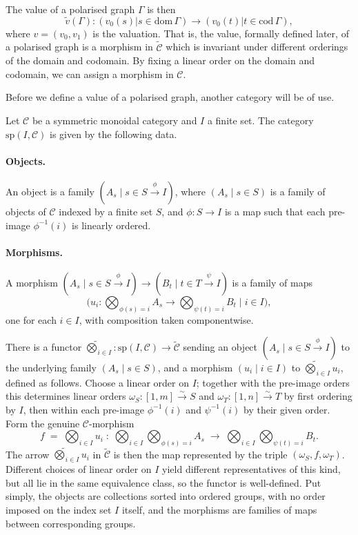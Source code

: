 The value of a polarised graph $\Gamma$ is then
\[
\widetilde{v}(\Gamma) : (v_0(s) \vert s \in \mathrm{dom}\,\Gamma) \to (v_0(t) \vert t \in \mathrm{cod}\,\Gamma),
\]
where $v=(v_0,v_1)$ is the valuation.
That is, the value, formally defined later, of a polarised graph is a morphism in $\widetilde{\mathcal{C}}$ which is invariant under different orderings of the domain and codomain.
By fixing a linear order on the domain and codomain, we can assign a morphism in $\mathcal{C}$.

Before we define a value of a polarised graph, another category will be of use.
\begin{definition}
    Let $\mathcal{C}$ be a symmetric monoidal category and $I$ a finite set.
    The category $\mathrm{sp}(I, \mathcal{C})$ is given by the following data.
    \paragraph{Objects.} An object is a family $(A_s \mid s \in S \xrightarrow{\phi} I)$,
    where $(A_s \mid s \in S)$ is a family of objects of $\mathcal{C}$ indexed by a
    finite set $S$, and $\phi : S \to I$ is a map such that each pre-image $\phi^{-1}(i)$
    is linearly ordered.
    \paragraph{Morphisms.} A morphism
    $(A_s \mid s \in S \xrightarrow{\phi} I) \to (B_t \mid t \in T \xrightarrow{\psi} I)$
    is a family of maps
    \[
      \Big(u_i : \bigotimes_{\phi(s) = i} A_s \to \bigotimes_{\psi(t) = i} B_t \;\Big\vert\; i \in I\Big),
    \]
    one for each $i \in I$, with composition taken componentwise.
\end{definition}
There is a functor $\widetilde{\bigotimes}_{i \in I} : \mathrm{sp}(I, \mathcal{C}) \to \widetilde{\mathcal{C}}$
sending an object $(A_s \mid s \in S \xrightarrow{\phi} I)$ to the underlying family
$(A_s \mid s \in S)$, and a morphism $(u_i \mid i \in I)$ to $\widetilde{\bigotimes}_{i \in I} u_i$,
defined as follows. Choose a linear order on $I$; together with the pre-image orders this
determines linear orders $\omega_S : [1,m] \xrightarrow{\sim} S$ and
$\omega_T : [1,n] \xrightarrow{\sim} T$ by first ordering by $I$, then within each pre-image $\phi^{-1}(i)$ and $\psi^{-1}(i)$ by their given order.
Form the genuine
$\mathcal{C}$-morphism
\[
  f \;=\; \bigotimes_{i \in I} u_i \;:\;
  \bigotimes_{i \in I} \bigotimes_{\phi(s) = i} A_s \;\longrightarrow\;
  \bigotimes_{i \in I} \bigotimes_{\psi(t) = i} B_t .
\]
The arrow $\widetilde{\bigotimes}_{i \in I} u_i$ in $\widetilde{\mathcal{C}}$ is then the
map represented by the triple $(\omega_S, f, \omega_T)$. Different choices of
linear order on $I$ yield different representatives of this kind, but all lie in the
same equivalence class, so the functor is well-defined.
Put simply, the objects are collections sorted into ordered groups, with no order imposed on the index set 
$I$ itself, and the morphisms are families of maps between corresponding groups.

